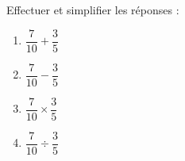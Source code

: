 
\begin{exercice}\label{exo2smath-0097}

    Effectuer et simplifier les réponses :
    \begin{multicols}{4}
        \begin{enumerate}
            \item
                \( \dfrac{ 7 }{ 10 }+\dfrac{ 3 }{ 5 }\) 
            \item
                \( \dfrac{ 7 }{ 10 }-\dfrac{ 3 }{ 5 }\) 
            \item
                \( \dfrac{ 7 }{ 10 }\times\dfrac{ 3 }{ 5 }\) 
            \item
                \( \dfrac{ 7 }{ 10 }\div\dfrac{ 3 }{ 5 }\) 
        \end{enumerate}
    \end{multicols}

\end{exercice}

